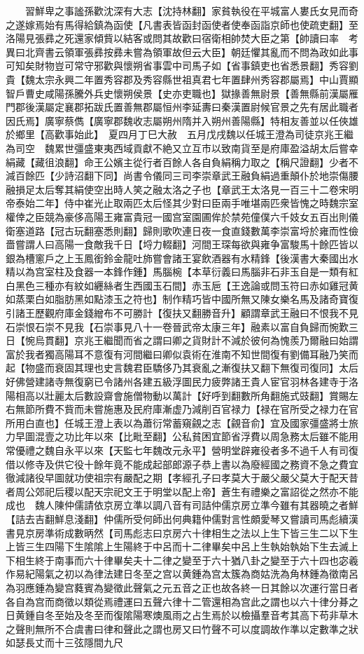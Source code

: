 　　習鮮卑之事謐孫歡沈深有大志【沈持林翻】家貧執役在平城富人婁氏女見而奇之遂嫁焉始有馬得給鎮為函使【凡書表皆函封函使者使奉函詣京師也使疏吏翻】至洛陽見張彞之死還家傾貲以結客或問其故歡曰宿衛相帥焚大臣之第【帥讀曰率　考異曰北齊書云領軍張彞按彞未嘗為領軍故但云大臣】朝廷懼其亂而不問為政如此事可知矣財物豈可常守邪歡與懷朔省事雲中司馬子如【省事鎮吏也省悉景翻】秀容劉貴【魏太宗永興二年置秀容郡及秀容縣世祖真君七年置肆州秀容郡屬焉】中山賈顯智戶曹史咸陽孫騰外兵史懷朔侯景【史亦吏職也】獄掾善無尉景【善無縣前漢屬雁門郡後漢屬定襄郡拓跋氏置善無郡屬恒州李延夀曰秦漢置尉候官景之先有居此職者因氏焉】廣寧蔡儁【廣寧郡魏收志屬朔州隋并入朔州善陽縣】特相友善並以任俠雄於鄉里【高歡事始此】　夏四月丁巳大赦　五月戊戌魏以任城王澄為司徒京兆王繼為司空　魏累世彊盛東夷西域貢獻不絶又立互市以致南貨至是府庫盈溢胡太后嘗幸絹藏【藏徂浪翻】命王公嬪主從行者百餘人各自負絹稱力取之【稱尺證翻】少者不減百餘匹【少詩沼翻下同】尚書令儀同三司李崇章武王融負絹過重顛仆於地崇傷腰融損足太后奪其絹使空出時人笑之融太洛之子也【章武王太洛見一百三十二卷宋明帝泰始二年】侍中崔光止取兩匹太后怪其少對曰臣兩手唯堪兩匹衆皆愧之時魏宗室權倖之臣競為豪侈高陽王雍富貴冠一國宫室園圃侔於禁苑僮僕六千妓女五百出則儀衛塞道路【冠古玩翻塞悉則翻】歸則歌吹連日夜一食直錢數萬李崇富埒於雍而性儉嗇嘗謂人曰高陽一食敵我千日【埒力輟翻】河間王琛每欲與雍争富駿馬十餘匹皆以銀為槽窻戶之上玉鳳銜鈴金龍吐斾嘗會諸王宴飲酒器有水精鋒【後漢書大秦國出水精以為宫室柱及食器一本鋒作鍾】馬腦椀【本草衍義曰馬腦非石非玉自是一類有紅白黑色三種亦有紋如纒絲者生西國玉石間】赤玉巵【王逸論或問玉符曰赤如雞冠黄如蒸栗白如脂肪黑如點漆玉之符也】制作精巧皆中國所無又陳女樂名馬及諸奇寶復引諸王歷觀府庫金錢繒布不可勝計【復扶又翻勝音升】顧謂章武王融曰不恨我不見石崇恨石崇不見我【石崇事見八十一卷晉武帝太康三年】融素以富自負歸而惋歎三日【惋烏貫翻】京兆王繼聞而省之謂曰卿之貨財計不減於彼何為愧羨乃爾融曰始謂富於我者獨高陽耳不意復有河間繼曰卿似袁術在淮南不知世間復有劉備耳融乃笑而起【物盛而衰固其理也史言魏君臣驕侈乃其衰亂之漸復扶又翻下無復司復同】太后好佛營建諸寺無復窮已令諸州各建五級浮圖民力疲弊諸王貴人宦官羽林各建寺于洛陽相高以壯麗太后數設齋會施僧物動以萬計【好呼到翻數所角翻施式豉翻】賞賜左右無節所費不貲而未嘗施惠及民府庫漸虚乃減削百官禄力【禄在官所受之禄力在官所用白直也】任城王澄上表以為蕭衍常蓄窺覦之志【覦音俞】宜及國家彊盛將士旅力早圖混壹之功比年以來【比毗至翻】公私貧困宜節省浮費以周急務太后雖不能用常優禮之魏自永平以來【天監七年魏改元永平】營明堂辟雍役者多不過千人有司復借以修寺及供它役十餘年竟不能成起部郎源子恭上書以為廢經國之務資不急之費宜徹減諸役早圖就功使祖宗有嚴配之期【孝經孔子曰孝莫大于嚴父嚴父莫大于配天昔者周公郊祀后稷以配天宗祀文王于明堂以配上帝】蒼生有禮樂之富詔從之然亦不能成也　魏人陳仲儒請依京房立準以調八音有司詰仲儒京房立準今雖有其器曉之者鮮【詰去吉翻鮮息淺翻】仲儒所受何師出何典籍仲儒對言性頗愛琴又嘗讀司馬彪續漢書見京房準術成數昞然【司馬彪志曰京房六十律相生之法以上生下皆三生二以下生上皆三生四陽下生隂隂上生陽終于中呂而十二律畢矣中呂上生執始執始下生去滅上下相生終于南事而六十律畢矣夫十二律之變至于六十猶八卦之變至于六十四也宓羲作易紀陽氣之初以為律法建日冬至之宫以黄鍾為宫太簇為商姑洗為角林鍾為徵南呂為羽應鍾為變宫蕤賓為變徵此聲氣之元五音之正也故各終一日其餘以次運行當日者各自為宫而商徵以類從焉禮運曰五聲六律十二管還相為宫此之謂也以六十律分朞之日黄鍾自冬至始及冬至而復隂陽寒燠風雨之占生焉於以檢攝羣音考其高下苟非草木之聲則無所不合虞書曰律和聲此之謂也房又曰竹聲不可以度調故作準以定數準之狀如瑟長丈而十三弦隱間九尺